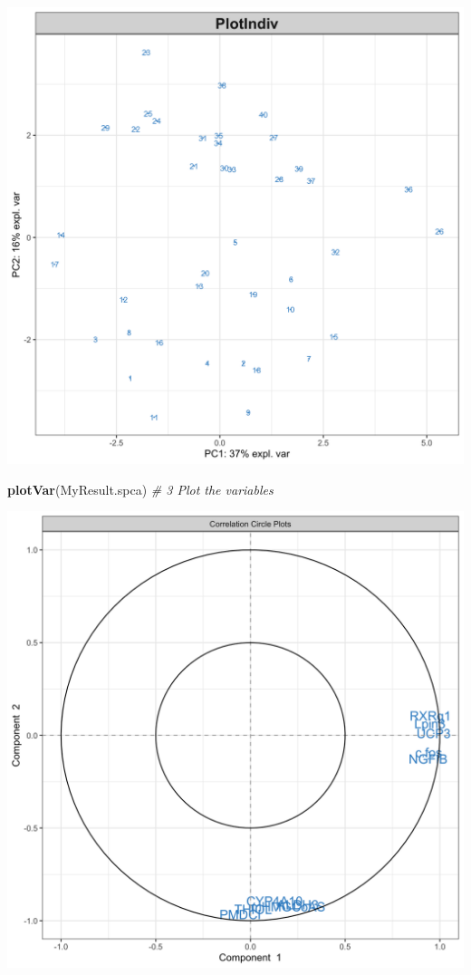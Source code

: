 \documentclass[]{book}
\newenvironment{Shaded}{\begin{snugshade}}{\end{snugshade}}
\newcommand{\CommentTok}[1]{\textcolor[rgb]{0.56,0.35,0.01}{\textit{#1}}}
\newcommand{\KeywordTok}[1]{\textcolor[rgb]{0.13,0.29,0.53}{\textbf{#1}}}
\newcommand{\NormalTok}[1]{#1}
\begin{document}
\begin{center}\includegraphics[width=0.75\linewidth,]{Figures/02-spca-nutrimouse-1} \end{center}

\begin{Shaded}
\begin{Highlighting}[]
\KeywordTok{plotVar}\NormalTok{(MyResult.spca)                 }\CommentTok{# 3 Plot the variables}
\end{Highlighting}
\end{Shaded}

\begin{center}\includegraphics[width=0.75\linewidth,]{Figures/02-spca-nutrimouse-2} \end{center}
\end{document}
